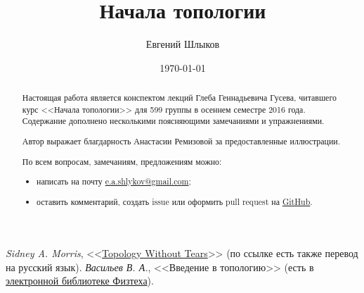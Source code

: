 \documentclass[12pt]{article}
\title{Начала топологии}
\author{Евгений Шлыков}
\affil{Московский физико-технический институт (государственный университет)}
\date{\today}
\theoremstyle{definition}
\theoremstyle{remark}
\theoremstyle{remark}
\theoremstyle{remark}
\theoremstyle{remark}
\begin{document}
\maketitle

\begin{abstract}
	Настоящая работа является конспектом лекций Глеба Геннадьевича Гусева, читавшего курс <<Начала топологии>>
	для 599 группы в осеннем семестре 2016 года. Содержание дополнено несколькими поясняющими замечаниями
	и упражнениями.

	Автор выражает благдарность Анастасии Ремизовой за предоставленные иллюстрации.

	По всем вопросам, замечаниям, предложениям можно:
	\begin{itemize}
		\item написать на почту
			\href{mailto:e.a.shlykov@gmail.com?subject=[diht-topology-notes]}{e.a.shlykov@gmail.com};
		\item оставить комментарий, создать issue или оформить pull request на
			\href{https://github.com/eshlykov/diht-topology-notes}{GitHub}.
	\end{itemize}
\end{abstract}

\tableofcontents
\newpage

\begin{thebibliography}{9}
	 \textit{Sidney A. Morris}, <<\href{http://www.topologywithouttears.net}{Topology Without Tears}>>
		(по ссылке есть также перевод на русский язык).
	 \textit{Васильев В. А.}, <<Введение в топологию>>
		(есть в \href{http://lib.mipt.ru}{электронной библиотеке Физтеха}).
\end{thebibliography}









\end{document}
